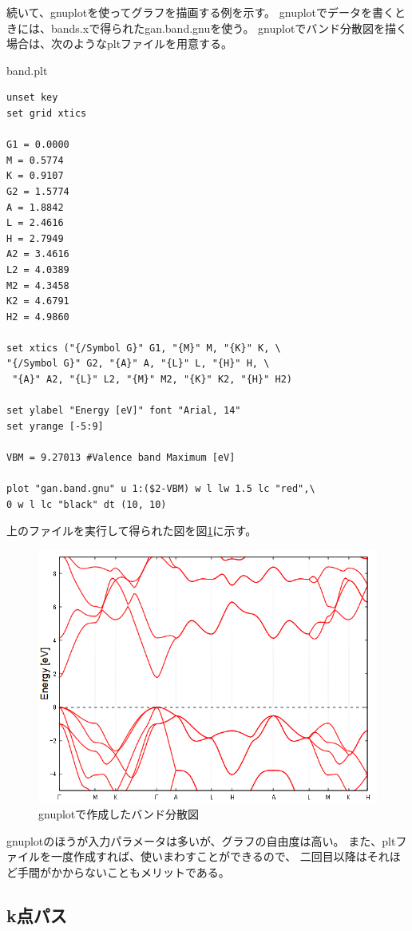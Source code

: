 続いて、gnuplotを使ってグラフを描画する例を示す。
gnuplotでデータを書くときには、bands.xで得られたgan.band.gnuを使う。
gnuplotでバンド分散図を描く場合は、次のようなpltファイルを用意する。

\begin{example}{band.plt}
\begin{verbatim}
unset key
set grid xtics

G1 = 0.0000
M = 0.5774
K = 0.9107
G2 = 1.5774
A = 1.8842
L = 2.4616
H = 2.7949
A2 = 3.4616
L2 = 4.0389
M2 = 4.3458
K2 = 4.6791
H2 = 4.9860

set xtics ("{/Symbol G}" G1, "{M}" M, "{K}" K, \
"{/Symbol G}" G2, "{A}" A, "{L}" L, "{H}" H, \
 "{A}" A2, "{L}" L2, "{M}" M2, "{K}" K2, "{H}" H2)

set ylabel "Energy [eV]" font "Arial, 14"
set yrange [-5:9]

VBM = 9.27013 #Valence band Maximum [eV]

plot "gan.band.gnu" u 1:($2-VBM) w l lw 1.5 lc "red",\
0 w l lc "black" dt (10, 10)
\end{verbatim}
\end{example}
上のファイルを実行して得られた図を図\ref{fig_gnuplot}に示す。

\begin{figure}[htb]
  \centering
  \includegraphics[scale=0.5]{./chap03/GaN_band.png}
  \caption{gnuplotで作成したバンド分散図}
  \label{fig_gnuplot}
\end{figure}
gnuplotのほうが入力パラメータは多いが、グラフの自由度は高い。
また、pltファイルを一度作成すれば、使いまわすことができるので、
二回目以降はそれほど手間がかからないこともメリットである。

\subsection{k点パス}
